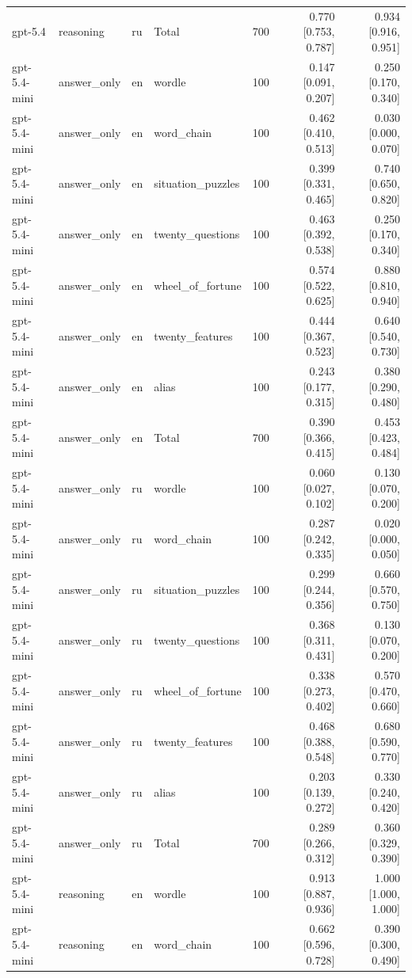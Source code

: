 \begin{longtable}{llllrrr}
gpt-5.4 & reasoning & ru & Total & 700 & 0.770 [0.753, 0.787] & 0.934 [0.916, 0.951] \\
gpt-5.4-mini & answer\_only & en & wordle & 100 & 0.147 [0.091, 0.207] & 0.250 [0.170, 0.340] \\
gpt-5.4-mini & answer\_only & en & word\_chain & 100 & 0.462 [0.410, 0.513] & 0.030 [0.000, 0.070] \\
gpt-5.4-mini & answer\_only & en & situation\_puzzles & 100 & 0.399 [0.331, 0.465] & 0.740 [0.650, 0.820] \\
gpt-5.4-mini & answer\_only & en & twenty\_questions & 100 & 0.463 [0.392, 0.538] & 0.250 [0.170, 0.340] \\
gpt-5.4-mini & answer\_only & en & wheel\_of\_fortune & 100 & 0.574 [0.522, 0.625] & 0.880 [0.810, 0.940] \\
gpt-5.4-mini & answer\_only & en & twenty\_features & 100 & 0.444 [0.367, 0.523] & 0.640 [0.540, 0.730] \\
gpt-5.4-mini & answer\_only & en & alias & 100 & 0.243 [0.177, 0.315] & 0.380 [0.290, 0.480] \\
gpt-5.4-mini & answer\_only & en & Total & 700 & 0.390 [0.366, 0.415] & 0.453 [0.423, 0.484] \\
gpt-5.4-mini & answer\_only & ru & wordle & 100 & 0.060 [0.027, 0.102] & 0.130 [0.070, 0.200] \\
gpt-5.4-mini & answer\_only & ru & word\_chain & 100 & 0.287 [0.242, 0.335] & 0.020 [0.000, 0.050] \\
gpt-5.4-mini & answer\_only & ru & situation\_puzzles & 100 & 0.299 [0.244, 0.356] & 0.660 [0.570, 0.750] \\
gpt-5.4-mini & answer\_only & ru & twenty\_questions & 100 & 0.368 [0.311, 0.431] & 0.130 [0.070, 0.200] \\
gpt-5.4-mini & answer\_only & ru & wheel\_of\_fortune & 100 & 0.338 [0.273, 0.402] & 0.570 [0.470, 0.660] \\
gpt-5.4-mini & answer\_only & ru & twenty\_features & 100 & 0.468 [0.388, 0.548] & 0.680 [0.590, 0.770] \\
gpt-5.4-mini & answer\_only & ru & alias & 100 & 0.203 [0.139, 0.272] & 0.330 [0.240, 0.420] \\
gpt-5.4-mini & answer\_only & ru & Total & 700 & 0.289 [0.266, 0.312] & 0.360 [0.329, 0.390] \\
gpt-5.4-mini & reasoning & en & wordle & 100 & 0.913 [0.887, 0.936] & 1.000 [1.000, 1.000] \\
gpt-5.4-mini & reasoning & en & word\_chain & 100 & 0.662 [0.596, 0.728] & 0.390 [0.300, 0.490] \\

\end{longtable}
